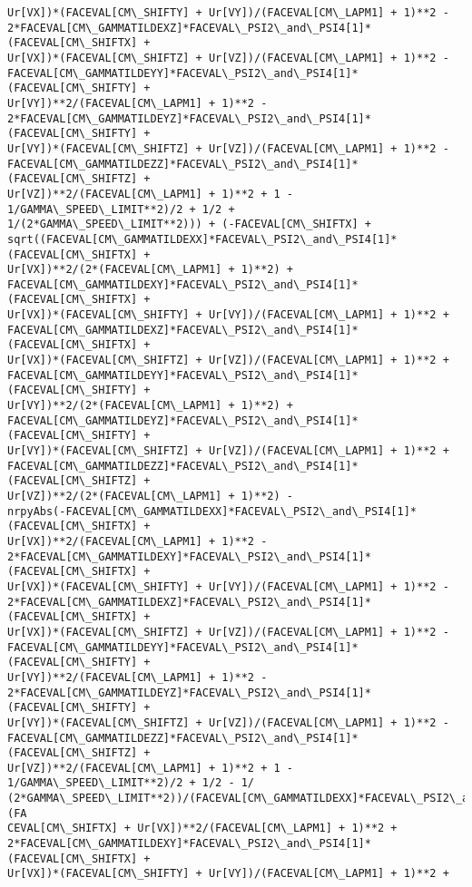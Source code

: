 \documentclass[landscape,letterpaper,10pt,english]{article}
\begin{document}
\begin{Verbatim}[commandchars=\\\{\}]
Ur[VX])*(FACEVAL[CM\_SHIFTY] + Ur[VY])/(FACEVAL[CM\_LAPM1] + 1)**2 -
2*FACEVAL[CM\_GAMMATILDEXZ]*FACEVAL\_PSI2\_and\_PSI4[1]*(FACEVAL[CM\_SHIFTX] +
Ur[VX])*(FACEVAL[CM\_SHIFTZ] + Ur[VZ])/(FACEVAL[CM\_LAPM1] + 1)**2 -
FACEVAL[CM\_GAMMATILDEYY]*FACEVAL\_PSI2\_and\_PSI4[1]*(FACEVAL[CM\_SHIFTY] +
Ur[VY])**2/(FACEVAL[CM\_LAPM1] + 1)**2 -
2*FACEVAL[CM\_GAMMATILDEYZ]*FACEVAL\_PSI2\_and\_PSI4[1]*(FACEVAL[CM\_SHIFTY] +
Ur[VY])*(FACEVAL[CM\_SHIFTZ] + Ur[VZ])/(FACEVAL[CM\_LAPM1] + 1)**2 -
FACEVAL[CM\_GAMMATILDEZZ]*FACEVAL\_PSI2\_and\_PSI4[1]*(FACEVAL[CM\_SHIFTZ] +
Ur[VZ])**2/(FACEVAL[CM\_LAPM1] + 1)**2 + 1 - 1/GAMMA\_SPEED\_LIMIT**2)/2 + 1/2 +
1/(2*GAMMA\_SPEED\_LIMIT**2))) + (-FACEVAL[CM\_SHIFTX] +
sqrt((FACEVAL[CM\_GAMMATILDEXX]*FACEVAL\_PSI2\_and\_PSI4[1]*(FACEVAL[CM\_SHIFTX] +
Ur[VX])**2/(2*(FACEVAL[CM\_LAPM1] + 1)**2) +
FACEVAL[CM\_GAMMATILDEXY]*FACEVAL\_PSI2\_and\_PSI4[1]*(FACEVAL[CM\_SHIFTX] +
Ur[VX])*(FACEVAL[CM\_SHIFTY] + Ur[VY])/(FACEVAL[CM\_LAPM1] + 1)**2 +
FACEVAL[CM\_GAMMATILDEXZ]*FACEVAL\_PSI2\_and\_PSI4[1]*(FACEVAL[CM\_SHIFTX] +
Ur[VX])*(FACEVAL[CM\_SHIFTZ] + Ur[VZ])/(FACEVAL[CM\_LAPM1] + 1)**2 +
FACEVAL[CM\_GAMMATILDEYY]*FACEVAL\_PSI2\_and\_PSI4[1]*(FACEVAL[CM\_SHIFTY] +
Ur[VY])**2/(2*(FACEVAL[CM\_LAPM1] + 1)**2) +
FACEVAL[CM\_GAMMATILDEYZ]*FACEVAL\_PSI2\_and\_PSI4[1]*(FACEVAL[CM\_SHIFTY] +
Ur[VY])*(FACEVAL[CM\_SHIFTZ] + Ur[VZ])/(FACEVAL[CM\_LAPM1] + 1)**2 +
FACEVAL[CM\_GAMMATILDEZZ]*FACEVAL\_PSI2\_and\_PSI4[1]*(FACEVAL[CM\_SHIFTZ] +
Ur[VZ])**2/(2*(FACEVAL[CM\_LAPM1] + 1)**2) -
nrpyAbs(-FACEVAL[CM\_GAMMATILDEXX]*FACEVAL\_PSI2\_and\_PSI4[1]*(FACEVAL[CM\_SHIFTX] +
Ur[VX])**2/(FACEVAL[CM\_LAPM1] + 1)**2 -
2*FACEVAL[CM\_GAMMATILDEXY]*FACEVAL\_PSI2\_and\_PSI4[1]*(FACEVAL[CM\_SHIFTX] +
Ur[VX])*(FACEVAL[CM\_SHIFTY] + Ur[VY])/(FACEVAL[CM\_LAPM1] + 1)**2 -
2*FACEVAL[CM\_GAMMATILDEXZ]*FACEVAL\_PSI2\_and\_PSI4[1]*(FACEVAL[CM\_SHIFTX] +
Ur[VX])*(FACEVAL[CM\_SHIFTZ] + Ur[VZ])/(FACEVAL[CM\_LAPM1] + 1)**2 -
FACEVAL[CM\_GAMMATILDEYY]*FACEVAL\_PSI2\_and\_PSI4[1]*(FACEVAL[CM\_SHIFTY] +
Ur[VY])**2/(FACEVAL[CM\_LAPM1] + 1)**2 -
2*FACEVAL[CM\_GAMMATILDEYZ]*FACEVAL\_PSI2\_and\_PSI4[1]*(FACEVAL[CM\_SHIFTY] +
Ur[VY])*(FACEVAL[CM\_SHIFTZ] + Ur[VZ])/(FACEVAL[CM\_LAPM1] + 1)**2 -
FACEVAL[CM\_GAMMATILDEZZ]*FACEVAL\_PSI2\_and\_PSI4[1]*(FACEVAL[CM\_SHIFTZ] +
Ur[VZ])**2/(FACEVAL[CM\_LAPM1] + 1)**2 + 1 - 1/GAMMA\_SPEED\_LIMIT**2)/2 + 1/2 - 1/
(2*GAMMA\_SPEED\_LIMIT**2))/(FACEVAL[CM\_GAMMATILDEXX]*FACEVAL\_PSI2\_and\_PSI4[1]*(FA
CEVAL[CM\_SHIFTX] + Ur[VX])**2/(FACEVAL[CM\_LAPM1] + 1)**2 +
2*FACEVAL[CM\_GAMMATILDEXY]*FACEVAL\_PSI2\_and\_PSI4[1]*(FACEVAL[CM\_SHIFTX] +
Ur[VX])*(FACEVAL[CM\_SHIFTY] + Ur[VY])/(FACEVAL[CM\_LAPM1] + 1)**2 +

\end{Verbatim}
\end{document}
